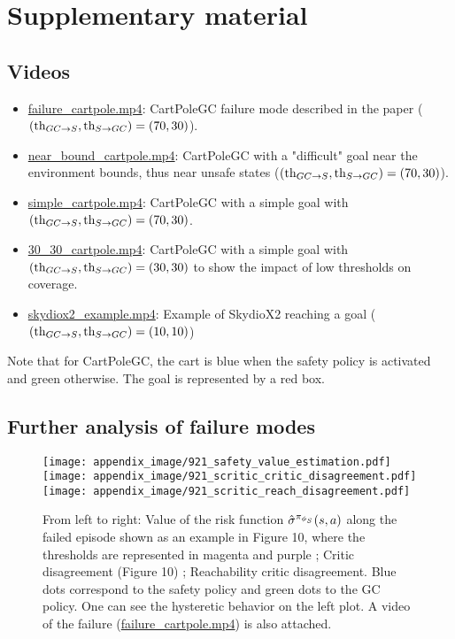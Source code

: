 \appendix


\onecolumn

\section{Supplementary material}

\subsection{Videos}

\begin{itemize}
  \item \url{failure\_cartpole.mp4}: CartPoleGC failure mode described in the paper ($(\text{th}_{GC \rightarrow S}, \text{th}_{S \rightarrow GC}) = (70, 30)$).
  \item \url{near\_bound\_cartpole.mp4}: CartPoleGC with a "difficult" goal near the environment bounds, thus near unsafe states ($(\text{th}_{GC \rightarrow S}, \text{th}_{S \rightarrow GC}) = (70, 30)$).
  \item \url{simple\_cartpole.mp4}: CartPoleGC with a simple goal with $(\text{th}_{GC \rightarrow S}, \text{th}_{S \rightarrow GC}) = (70, 30)$.
  \item \url{30\_30\_cartpole.mp4}: CartPoleGC with a simple goal with $(\text{th}_{GC \rightarrow S}, \text{th}_{S \rightarrow GC}) = (30, 30)$ to show the impact of low thresholds on coverage.
  \item \url{skydiox2\_example.mp4}: Example of SkydioX2 reaching a goal ($(\text{th}_{GC \rightarrow S}, \text{th}_{S \rightarrow GC}) = (10, 10)$)
\end{itemize}

Note that for CartPoleGC, the cart is blue when the safety policy is activated and green otherwise.
The goal is represented by a red box. 

\subsection{Further analysis of failure modes}

\begin{figure}[ht]
  \texttt{[image: appendix\_image/921\_safety\_value\_estimation.pdf]}
  \texttt{[image: appendix\_image/921\_scritic\_critic\_disagreement.pdf]}
  \texttt{[image: appendix\_image/921\_scritic\_reach\_disagreement.pdf]}
  \caption{From left to right: Value of the risk function $\hat{\sigma}^{\pi_{\phi_S}}(s, a)$ along the failed episode
  shown as an example in Figure 10, where the thresholds are represented in magenta and purple ; Critic disagreement (Figure 10) ; Reachability critic disagreement.
  Blue dots correspond to the safety policy and green dots to the GC policy. One can see the hysteretic behavior on the left plot. A video of the failure (\url{failure\_cartpole.mp4}) is also attached.}
  \label{fig:failures}
\end{figure}

